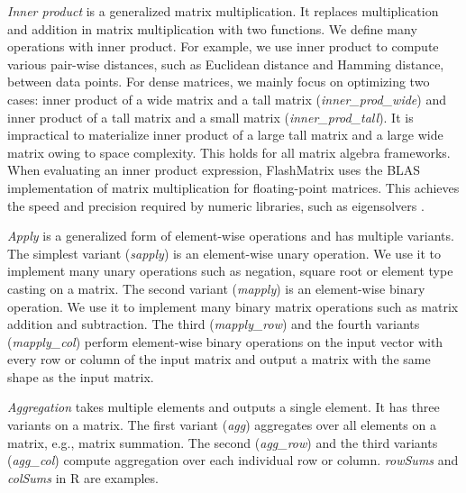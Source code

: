 \textit{Inner product} is a generalized matrix multiplication. It replaces
multiplication and addition in matrix multiplication with two functions.
We define many operations with inner product. For example, we use inner product
to compute various pair-wise distances, such as Euclidean distance and Hamming
distance, between data points. For dense matrices, we mainly focus on
optimizing two cases: inner product of a wide matrix and a tall matrix (\textit{inner\_prod\_wide}) and inner product of a tall matrix and a small
matrix (\textit{inner\_prod\_tall}). It is impractical to
materialize inner product of a large tall matrix and a large wide matrix owing
to space complexity. This holds for all matrix algebra frameworks.
When evaluating an inner product expression, FlashMatrix uses the BLAS 
implementation of matrix multiplication for floating-point matrices.
This achieves the speed and precision required by
numeric libraries, such as eigensolvers \cite{anasazi, FlashEigen}.

\textit{Apply} is a generalized form of element-wise operations and has
multiple variants. The simplest variant (\textit{sapply}) is
an element-wise unary operation. We use it to implement many unary
operations such as negation, square root or element type casting
on a matrix. The second variant (\textit{mapply}) is an
element-wise binary operation. We use it to implement many binary
matrix operations such as matrix addition and subtraction. The third
(\textit{mapply\_row}) and the fourth variants (\textit{mapply\_col}) perform element-wise
binary operations on the input vector with every row or column of the input
matrix and output a matrix with the same shape as the input matrix.

\textit{Aggregation} takes multiple elements and outputs a single element.
It has three variants on a matrix. The first variant (\textit{agg})
aggregates over all elements on a matrix, e.g., matrix summation. The second
(\textit{agg\_row}) and the third variants (\textit{agg\_col})
compute aggregation over each individual row or column. \textit{rowSums}
and \textit{colSums} in R are examples.

